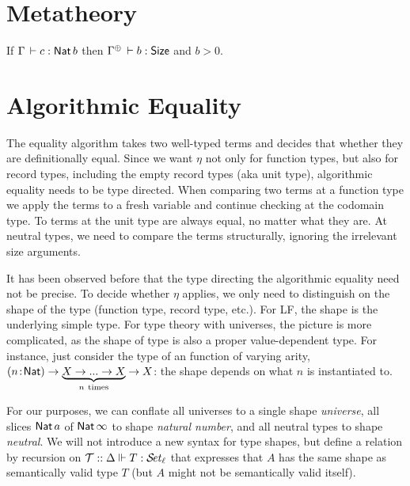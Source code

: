 \documentclass[acmlarge,review,anonymous]{acmart}\settopmatter{printfolios=true}
\begin{document}
\newpage

\section{Metatheory}
\label{sec:meta}


\begin{lemma}
\label{lem:invdata} \bla
If\/ $\Gamma \,\vdash c : \mathsf{Nat}\, b$ then $\resurrect\Gamma \der b : \Size$ and $b > 0$.
\end{lemma}


\newpage

\section{Algorithmic Equality}

The equality algorithm takes two well-typed terms and decides that
whether they are definitionally equal.  Since we want $\eta$ not only
for function types, but also for record types, including the empty
record types (aka unit type), algorithmic equality needs to be type
directed.  When comparing two terms at a function type we apply the
terms to a fresh variable and continue checking at the codomain type.
To terms at the unit type are always equal, no matter what they are.
At neutral types, we need to compare the terms structurally, ignoring
the irrelevant size arguments.

It has been observed before \cite{harperPfenning:equivalenceLF} that
the type directing the algorithmic equality need not be precise.  To
decide whether $\eta$ applies, we only need to distinguish on the
shape of the type (function type, record type, etc.).  For LF, the
shape is the underlying simple type.  For type theory with universes,
the picture is more complicated, as the shape of type is also a proper
value-dependent type.  For instance, just consider the type of an
function of varying arity, $(n \!:\! \mathsf{Nat}) \to \underbrace{X \to ... \to
  X}_{n~\mathrm{times}} \to X$: the shape depends on what $n$ is
instantiated to.

For our purposes, we can conflate all universes to a single shape
\emph{universe}, all slices $\mathsf{Nat}\, a$ of $\mathsf{Nat}\, \infty$ to shape
\emph{natural number}, and all neutral types to shape \emph{neutral}.
We will not introduce a new syntax for type shapes, but define a
relation  by recursion on
$\mathcal{T} :: \Delta \Vdash T : {\mathcal{S}\!\mathit{et}_{\ell}}$ that expresses that $A$ has the same shape
as semantically valid type $T$ (but $A$ might not be semantically
valid itself).
\end{document}
